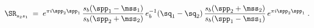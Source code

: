 \begin{equation}
\SR_{s_2s_1}^{}\;=\;e^{\pi i\spp_2\spp_1}\,
\frac{s_b(\spp_1-\mss_1)}{s_b(\spp_2+\mss_2)}\,
e_b^{-1}(\sq_1-\sq_2)\,
\frac{s_b(\spp_2+\mss_2)}{s_b(\spp_1-\mss_1)}\,e^{\pi i\spp_2\spp_1}\; .
\end{equation}

